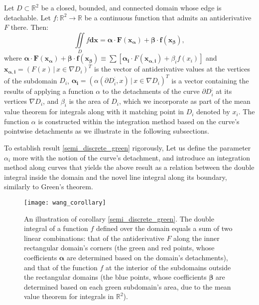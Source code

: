 \documentclass[11pt]{book}
\begin{document}
\begin{corollary}\label{semi_discrete_green}Let $D\subset\mathbb{R}^{2}$ be a closed, bounded, and connected domain whose edge is detachable. Let $f:\mathbb{R}^{2}\rightarrow\mathbb{R}$ be a continuous function that admits an antiderivative $F$ there. Then:
$$\underset{{\scriptscriptstyle D}}{\iint}f\boldsymbol{dx}=\boldsymbol{\alpha}\cdot\boldsymbol{F\left(x_{\alpha}\right)}+\boldsymbol{\beta}\cdot\boldsymbol{f\left(x_{\beta}\right)},$$
where $\boldsymbol{\alpha}\cdot\boldsymbol{F\left(x_{\alpha}\right)}+\boldsymbol{\beta}\cdot\boldsymbol{f\left(x_{\beta}\right)}\equiv\sum\left[\boldsymbol{\alpha_{i}}\cdot F\left(\boldsymbol{x_{\alpha,i}}\right)+\beta_{i}f\left(x_{i}\right)\right]$ and $\boldsymbol{x_{\alpha,i}}=\left(F\left(x\right)\,|\,x\in\nabla D_{i}\right)^T$ is the vector of antiderivative values at the vertices of the subdomain $D_{i}$, $\boldsymbol{\alpha_{i}}=\left(\alpha\left(\partial D_{i}^{;},x\right)\,|\,x\in\nabla D_{i}\right)^T$ is a vector containing the results of applying a function $\alpha$ to the detachments of the curve $\partial D_{i}^{;}$ at its vertices $\nabla D_{i}$, and $\beta_i$ is the area of $D_i$, which we incorporate as part of the mean value theorem for integrals along with it matching point in $D_i$ denoted by $x_i$. The function $\alpha$ is constructed within the integration method based on the curve's pointwise detachments as we illustrate in the following subsections.
\end{corollary}

To establish result \ref{semi_discrete_green} rigorously, Let us define the parameter $\alpha_i$ more with the notion of the curve's detachment, and introduce an integration method along curves that yields the above result as a relation between the double integral inside the domain and the novel line integral along its boundary, similarly to Green's theorem.

\begin{figure}
\texttt{[image: wang\_corollary]}
\caption{An illustration of corollary \ref{semi_discrete_green}. The double integral of a function $f$ defined over the domain equals a sum of two linear combinations: that of the antiderivative $F$ along the inner rectangular domain's corners (the green and red points, whose coefficients $\boldsymbol{\alpha}$ are determined based on the domain's detachments), and that of the function $f$ at the interior of the subdomains outside the rectangular domains (the blue points, whose coefficients $\boldsymbol{\beta}$ are determined based on each green subdomain's area, due to the mean value theorem for integrals in $\mathbb{R}^2$).}
\label{ftc_on_grd}
\end{figure}
\end{document}
